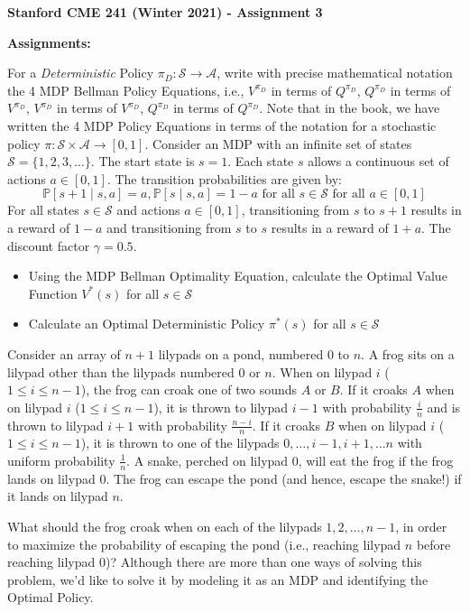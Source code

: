 \documentclass[12pt]{exam}
\begin{document}
\begin{center}
{\large {\bf Stanford CME 241 (Winter 2021) - Assignment 3}}
\end{center}
 
{\large{\bf Assignments:}}
\begin{questions}
\question For a {\em Deterministic} Policy $\pi_D: \mathcal{S} \rightarrow \mathcal{A}$,  write with precise mathematical notation the 4 MDP Bellman Policy Equations, i.e., $V^{\pi_D}$ in terms of $Q^{\pi_D}$, $Q^{\pi_D}$ in terms of $V^{\pi_D}$, $V^{\pi_D}$ in terms of $V^{\pi_D}$, $Q^{\pi_D}$ in terms of $Q^{\pi_D}$. Note that in the book, we have written the 4 MDP Policy Equations in terms of the notation for a stochastic policy $\pi: \mathcal{S} \times \mathcal{A} \rightarrow [0, 1]$.
\question Consider an MDP with an infinite set of states $\mathcal{S} = \{1,2,3,\ldots \}$. The start state is $s=1$. Each state $s$ allows a continuous set of actions $a \in [0,1]$. The transition probabilities are given by: $$\mathbb{P}[s+1 \mid s, a] = a, \mathbb{P}[s \mid s, a] = 1 - a \mbox{ for all } s \in \mathcal{S} \mbox{ for all } a \in [0,1]$$
 For all states $s \in \mathcal{S}$ and actions $a \in [0,1]$, transitioning from $s$ to $s+1$ results in a reward of $1-a$ and transitioning from $s$ to $s$ results in a reward of $1+a$. The discount factor $\gamma=0.5$.
\begin{itemize}
\item Using the MDP Bellman Optimality Equation, calculate the Optimal Value Function $V^*(s)$ for all $s \in \mathcal{S}$
\item Calculate an Optimal Deterministic Policy $\pi^*(s)$ for all $s \in \mathcal{S}$
\end{itemize}
\question Consider an array of $n+1$ lilypads on a pond, numbered $0$ to $n$. A frog sits on a lilypad other than the lilypads numbered $0$ or $n$.  When on lilypad $i$ ($1\leq i \leq n-1$), the frog can croak one of two sounds $A$ or $B$. If it croaks $A$ when on lilypad $i$ ($1 \leq i \leq n-1$), it is thrown to lilypad $i-1$ with probability $\frac i n$ and is thrown to lilypad $i+1$ with probability $\frac {n-i} n$. If it croaks $B$ when on lilypad $i$ ($1\leq i \leq n-1$), it is thrown to one of the lilypads $0, \ldots, i-1, i+1, \ldots n$ with uniform probability $\frac 1 n$. A snake, perched on lilypad $0$, will eat the frog if the frog lands on lilypad $0$. The frog can escape the pond (and hence, escape the snake!) if it lands on lilypad $n$.

What should the frog croak when on each of the lilypads $1, 2, \ldots, n-1$, in order to maximize the probability of escaping the pond (i.e., reaching lilypad $n$ before reaching lilypad $0$)? Although there are more than one ways of solving this problem, we'd like to solve it by modeling it as an MDP and identifying the Optimal Policy.


\end{questions}
\end{document}
